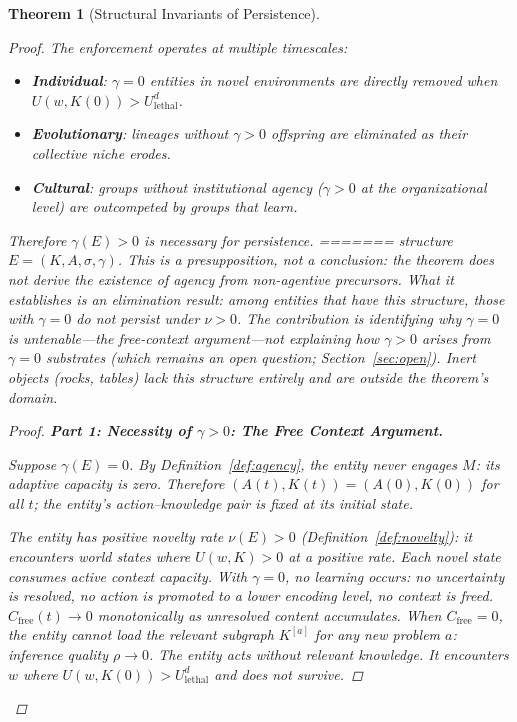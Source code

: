 \documentclass[11pt]{article}
\newtheorem{theorem}{Theorem}
\theoremstyle{definition}
\theoremstyle{remark}
\begin{document}
\begin{theorem}[Structural Invariants of Persistence]
\begin{proof}
The enforcement operates at multiple timescales:
\begin{itemize}
\item \textbf{Individual}: $\gamma = 0$ entities in novel environments are
      directly removed when $U(w, K(0)) > U_{\mathrm{lethal}}^d$.
\item \textbf{Evolutionary}: lineages without $\gamma > 0$ offspring are
      eliminated as their collective niche erodes.
\item \textbf{Cultural}: groups without institutional agency ($\gamma > 0$
      at the organizational level) are outcompeted by groups that learn.
\end{itemize}

Therefore $\gamma(E) > 0$ is necessary for persistence.
=======
structure $E = (K, A, \sigma, \gamma)$. This is a presupposition, not a
conclusion: the theorem does not derive the \emph{existence} of agency
from non-agentive precursors. What it establishes is an
\emph{elimination result}: among entities that have this structure,
those with $\gamma = 0$ do not persist under $\nu > 0$. The
contribution is identifying \emph{why} $\gamma = 0$ is untenable---the
free-context argument---not explaining how $\gamma > 0$ arises from
$\gamma = 0$ substrates (which remains an open question;
Section~\ref{sec:open}). Inert objects (rocks, tables) lack this
structure entirely and are outside the theorem's domain.

\begin{proof}

\textbf{Part 1: Necessity of $\gamma > 0$: The Free Context Argument.}

Suppose $\gamma(E) = 0$. By Definition~\ref{def:agency}, the entity never
engages $M$: its adaptive capacity is zero. Therefore $(A(t), K(t)) =
(A(0), K(0))$ for all $t$; the entity's action--knowledge pair is
fixed at its initial state.

The entity has positive novelty rate $\nu(E) > 0$
(Definition~\ref{def:novelty}): it encounters world states where
$U(w, K) > 0$ at a positive rate. Each novel state consumes active
context capacity. With $\gamma = 0$, no learning occurs: no uncertainty
is resolved, no action is promoted to a lower encoding level, no
context is freed. $C_{\mathrm{free}}(t) \to 0$ monotonically as
unresolved content accumulates. When $C_{\mathrm{free}} = 0$, the
entity cannot load the relevant subgraph $K^{[a]}$ for any new problem
$a$: inference quality $\rho \to 0$. The entity acts without relevant
knowledge. It encounters $w$ where $U(w, K(0)) > U_{\mathrm{lethal}}^d$
and does not survive.


\end{proof}
\end{proof}
\end{theorem}
\end{document}
